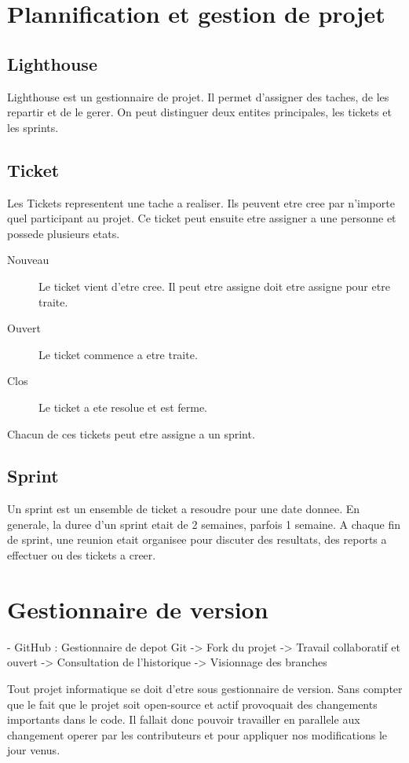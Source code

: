 \section{Plannification et gestion de projet}
\subsection{Lighthouse}
Lighthouse est un gestionnaire de projet. Il permet d'assigner des taches, de les repartir et de le gerer. On peut distinguer deux entites principales, les tickets et les sprints.
\subsection{Ticket}
Les Tickets representent une tache a realiser. Ils peuvent etre cree par n'importe quel participant au projet. Ce ticket peut ensuite etre assigner a une personne et possede plusieurs etats.
\begin{description}
\item[Nouveau] Le ticket vient d'etre cree. Il peut etre assigne doit etre assigne pour etre traite.
\item[Ouvert] Le ticket commence a etre traite.
\item[Clos] Le ticket a ete resolue et est ferme.
\end{description}
Chacun de ces tickets peut etre assigne a un sprint.
\subsection{Sprint}
Un sprint est un ensemble de ticket a resoudre pour une date donnee. En generale, la duree d'un sprint etait de 2 semaines, parfois 1 semaine. A chaque fin de sprint, une reunion etait organisee pour discuter des resultats, des reports a effectuer ou des tickets a creer.
\section{Gestionnaire de version}

- GitHub : Gestionnaire de depot Git
-> Fork du projet
-> Travail collaboratif et ouvert 
-> Consultation de l'historique
-> Visionnage des branches

Tout projet informatique se doit d'etre sous gestionnaire de version. Sans compter que le fait que le projet soit open-source et actif provoquait des changements importants dans le code. Il fallait donc pouvoir travailler en parallele aux changement operer par les contributeurs et pour appliquer nos modifications le jour venus.


